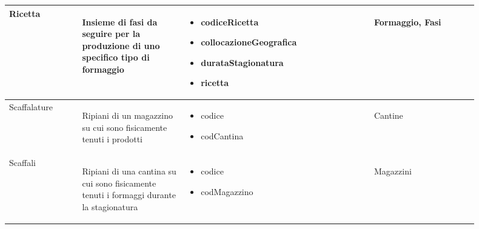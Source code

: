 \documentclass[12pt,a4paper]{article}
\begin{document}
\begin{center}
\begin{longtable}{|p{0.14\linewidth}|p{0.20\linewidth}|p{0.36\linewidth}|p{0.20\linewidth}|}
\hline
Ricetta				 	& \begin{flushleft}\vspace{-25pt} Insieme di fasi da seguire per la produzione di uno specifico tipo di formaggio  \end{flushleft}
					& \begin{itemize}
						\setlength{\itemindent}{-1em}
						\vspace{-25pt}
						\setlength\itemsep{-0.25em}
						\item codiceRicetta
						\item collocazioneGeografica
						\item durataStagionatura
						\item ricetta
					\end{itemize}
					& \begin{flushleft}\vspace{-25pt} Formaggio, Fasi \end{flushleft} \\ 

\hline
Scaffalature				 	& \begin{flushleft}\vspace{-25pt} Ripiani di un magazzino su cui sono fisicamente tenuti i prodotti \end{flushleft}
					& \begin{itemize}
						\setlength{\itemindent}{-1em}
						\vspace{-25pt}
						\setlength\itemsep{-0.25em}
						\item codice
						\item codCantina
					\end{itemize}
					& \begin{flushleft}\vspace{-25pt} Cantine \end{flushleft} \\ 

\hline
Scaffali				 	& \begin{flushleft}\vspace{-25pt} Ripiani di una cantina su cui sono fisicamente tenuti i formaggi durante la stagionatura \end{flushleft}
					& \begin{itemize}
						\setlength{\itemindent}{-1em}
						\vspace{-25pt}
						\setlength\itemsep{-0.25em}
						\item codice
						\item codMagazzino
					\end{itemize}
					& \begin{flushleft}\vspace{-25pt} Magazzini \end{flushleft} \\ 


\end{longtable}
\end{center}
\end{document}
